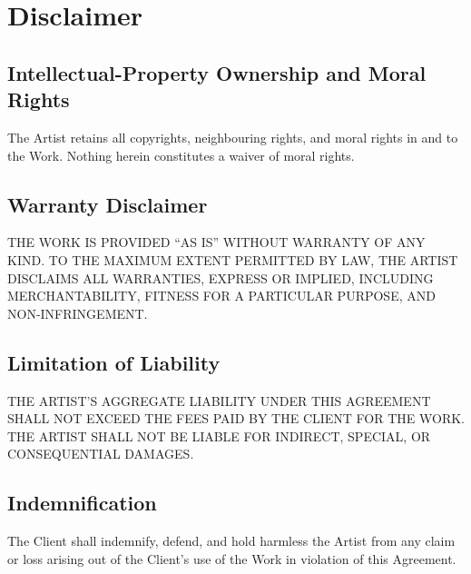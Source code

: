 \section{Disclaimer}


\subsection{Intellectual-Property Ownership and Moral Rights}
The Artist retains all copyrights, neighbouring rights, and moral rights in 
and to the Work.
Nothing herein constitutes a waiver of moral rights.


\subsection{Warranty Disclaimer}
THE WORK IS PROVIDED “AS IS” WITHOUT WARRANTY OF ANY KIND. 
TO THE MAXIMUM EXTENT PERMITTED BY LAW, THE ARTIST DISCLAIMS ALL WARRANTIES, 
EXPRESS OR IMPLIED, INCLUDING MERCHANTABILITY, FITNESS FOR A PARTICULAR PURPOSE, 
AND NON-INFRINGEMENT.


\subsection{Limitation of Liability}
THE ARTIST'S AGGREGATE LIABILITY UNDER THIS AGREEMENT SHALL NOT EXCEED THE 
FEES PAID BY THE CLIENT FOR THE WORK. 
THE ARTIST SHALL NOT BE LIABLE FOR INDIRECT, SPECIAL, OR CONSEQUENTIAL 
DAMAGES.


\subsection{Indemnification}
The Client shall indemnify, defend, and hold harmless the Artist from any 
claim or loss arising out of the Client's use of the Work in violation of this 
Agreement.
